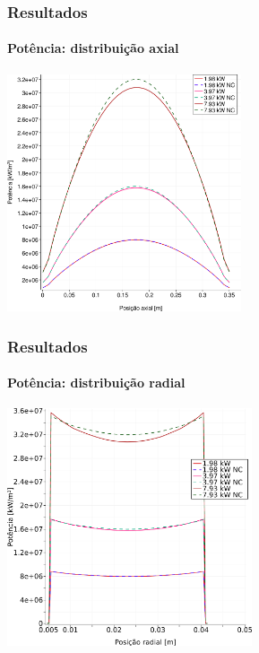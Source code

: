 \documentclass[svgnames,smaller,table]{beamer}
\begin{document}
\begin{frame}
  \frametitle{Resultados}
  \framesubtitle{Potência: distribuição axial}
  \centering\includegraphics[width=\textwidth, height=7.0cm]{../figuras/Q_all_z_square_port.png}
  \label{fig:keff50}
\end{frame}

\begin{frame}
  \frametitle{Resultados}
  \framesubtitle{Potência: distribuição radial}
  \centering\includegraphics[width=\textwidth, height=7.0cm]{../figuras/Q_all_x_square_port.png}
  \label{fig:keff50}
\end{frame}
\end{document}
